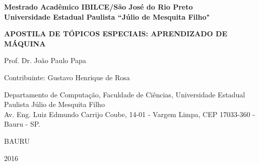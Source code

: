 \thispagestyle{empty}

\begin{center}
\renewcommand{\baselinestretch}{1}
\end{center}

\vspace*{1cm}

\begin{center}
\textbf{Mestrado Acadêmico IBILCE/São José do Rio Preto\\}
\textbf{Universidade Estadual Paulista ``Júlio de Mesquita Filho"}

\vspace*{1cm}

\renewcommand{\baselinestretch}{2}
\bf {\huge \sc APOSTILA DE TÓPICOS ESPECIAIS: APRENDIZADO DE MÁQUINA}
\renewcommand{\baselinestretch}{1}

\end{center}

\vspace*{2.0cm}

\begin{center}

\large Prof. Dr. Jo\~{a}o Paulo Papa

\vspace*{1.0cm}

\large Contribuinte: Gustavo Henrique de Rosa

\vspace*{1.0cm}

Departamento de Computa\c{c}\~{a}o, Faculdade de Ci\^{e}ncias, Universidade Estadual Paulista J\'ulio de Mesquita Filho\\
Av. Eng. Luiz Edmundo Carrijo Coube, 14-01 - Vargem Limpa, CEP 17033-360 - Bauru - SP.

\end{center}

\vspace*{4cm}

\centerline{\large BAURU}

\vspace*{0.25cm}

\centerline{\large 2016}

